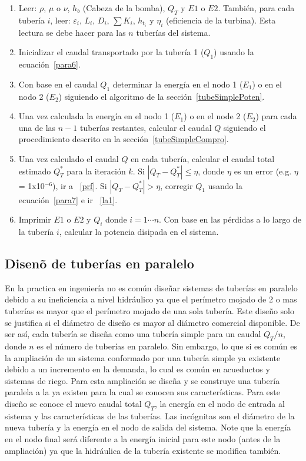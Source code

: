 \documentclass[10pt, oneside]{article}
\begin{document}
\begin{enumerate}
\item Leer: $\rho$, $\mu$ o $\nu$, $h_{b}$ (Cabeza de la bomba), $Q_T$ y $E1$ o $E2$. Tambi\'en, para cada tuber\'ia $i$, leer: $\varepsilon_i$, $L_i$, $D_i$, $\sum K_i$, $h_{t_i}$ y $\eta_i$ (eficiencia de la turbina). Esta lectura se debe hacer para las $n$ tuber\'ias del sistema.
\item Inicializar el caudal transportado por la tuber\'ia 1 ($Q_1$) usando la ecuaci\'on~\ref{para6}.
\item \label{la1} Con base en el caudal $Q_1$ determinar la energ\'ia en el nodo 1 ($E_1$) o en el nodo 2 ($E_2$) siguiendo el algoritmo de la secci\'on~\ref{tubeSimplePoten}.
\item Una vez calculada la energ\'ia en el nodo 1 ($E_1$) o en el node 2 ($E_2$) para cada una de las $n-1$ tuber\'ias restantes, calcular el caudal $Q$ siguiendo el procedimiento descrito en la secci\'on~\ref{tubeSimpleCompro}.  
\item Una vez calculado el caudal $Q$ en cada tuber\'ia, calcular el caudal total estimado $Q_T^*$ para la iteraci\'on $k$. Si $|Q_T - Q_T^*| \leq \eta$, donde $\eta$ es un error  (e.g. $\eta$ = 1x10$^{-6}$), ir a ~\ref{prf}. Si $|Q_T - Q_T^*| > \eta$, corregir $Q_1$ usando la ecuaci\'on~\ref{para7} e ir ~\ref{la1}.
\item \label{prf} Imprimir $E1$ o $E2$ y $Q_i$ donde $i=1 \cdots n$. Con base en las p\'erdidas a lo largo de la tuber\'ia $i$, calcular la potencia disipada en el sistema.
\end{enumerate}

\subsection{Disen\~o de  tuber\'ias en paralelo}
En la practica en ingenier\'ia no es com\'un dise\~nar sistemas de tuber\'ias en paralelo debido a su ineficiencia a nivel hidr\'aulico ya que el per\'imetro mojado de 2 o mas tuber\'ias es mayor que el per\'imetro mojado de una sola tuber\'ia. Este dise\~no solo se justifica si el di\'ametro de dise\~no es mayor al di\'ametro comercial disponible. De ser as\'i, cada tuber\'ia se dise\~na como una tuber\'ia simple para un caudal $Q_T/n$, donde $n$ es el n\'umero de tuber\'ias en paralelo. Sin embargo, lo que si es com\'un es la ampliaci\'on de un sistema conformado por una tuber\'ia simple ya existente debido a un incremento en la demanda, lo cual es com\'un en acueductos y sistemas de riego. Para esta ampliaci\'on se dise\~na y se construye una tuber\'ia paralela a la ya existen para la cual se conocen sus caracter\'isticas. Para este dise\~no se conoce el nuevo caudal total $Q_T$, la energ\'ia en el nodo de entrada al sistema y las caracter\'isticas de las tuber\'ias. Las inc\'ognitas son el di\'ametro de la nueva tuber\'ia y la energ\'ia en el nodo de salida del sistema. Note que la energ\'ia en el nodo final ser\'a diferente a la energ\'ia inicial para este nodo (antes de la ampliaci\'on) ya que la hidr\'aulica de la tuber\'ia existente se modifica tambi\'en.
\end{document}
